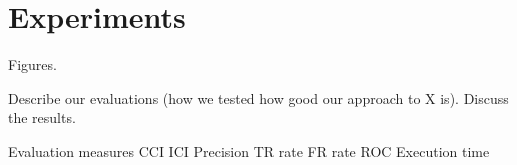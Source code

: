 \section{Experiments}

Figures.


Describe our evaluations (how we tested how good our approach to X is). Discuss the results.

Evaluation measures
CCI
ICI
Precision
TR rate
FR rate
ROC
Execution time
